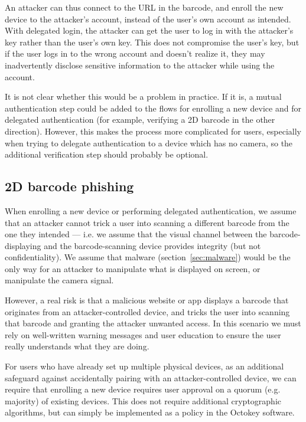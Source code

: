 An attacker can thus connect to the URL in the barcode, and enroll the new device to the attacker's
account, instead of the user's own account as intended. With delegated login, the attacker can get
the user to log in with the attacker's key rather than the user's own key. This does not compromise
the user's key, but if the user logs in to the wrong account and doesn't realize it, they may
inadvertently disclose sensitive information to the attacker while using the account.

It is not clear whether this would be a problem in practice. If it is, a mutual authentication step
could be added to the flows for enrolling a new device and for delegated authentication (for
example, verifying a 2D barcode in the other direction). However, this makes the process more
complicated for users, especially when trying to delegate authentication to a device which has no
camera, so the additional verification step should probably be optional.

\subsection{2D barcode phishing}\label{sec:barcode-phishing}

When enrolling a new device or performing delegated authentication, we assume that an attacker
cannot trick a user into scanning a different barcode from the one they intended --- i.e. we assume
that the visual channel between the barcode-displaying and the barcode-scanning device provides
integrity (but not confidentiality). We assume that malware (section~\ref{sec:malware}) would be the
only way for an attacker to manipulate what is displayed on screen, or manipulate the camera signal.

However, a real risk is that a malicious website or app displays a barcode that originates from an
attacker-controlled device, and tricks the user into scanning that barcode and granting the attacker
unwanted access. In this scenario we must rely on well-written warning messages and user education
to ensure the user really understands what they are doing.

For users who have already set up multiple physical devices, as an additional safeguard against
accidentally pairing with an attacker-controlled device, we can require that enrolling a new device
requires user approval on a quorum (e.g. majority) of existing devices. This does not require
additional cryptographic algorithms, but can simply be implemented as a policy in the Octokey
software.

